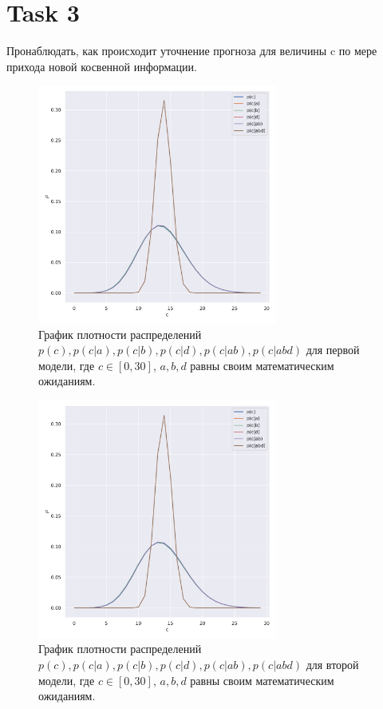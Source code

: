 \section{Task 3}

\begin{task}
    Пронаблюдать, как происходит уточнение прогноза для величины c по мере прихода новой косвенной информации.
\end{task}


\begin{solution}
    \begin{figure}[H]
        \centering
        \includegraphics[width=0.7\textwidth]{pics/task3_1.pdf}
        \caption{График плотности распределений $p(c), p(c|a), p(c|b), p(c|d), p(c|ab), p(c|abd)$ для первой модели, где $c \in [0, 30]$, $a, b, d$ равны своим математическим ожиданиям.}
    \end{figure}

    \begin{figure}[H]
        \centering
        \includegraphics[width=0.7\textwidth]{pics/task3_2.pdf}
        \caption{График плотности распределений $p(c), p(c|a), p(c|b), p(c|d), p(c|ab), p(c|abd)$ для второй модели, где $c \in [0, 30]$, $a, b, d$ равны своим математическим ожиданиям.}
    \end{figure}


\end{solution}
